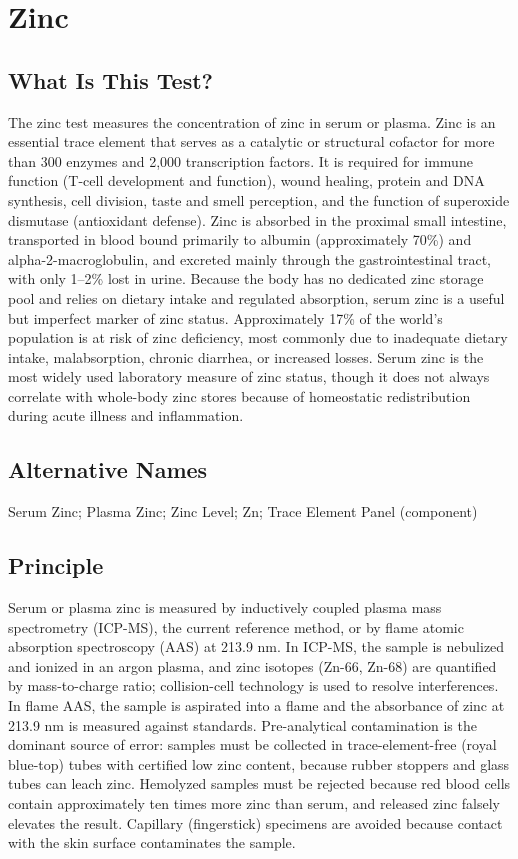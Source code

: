 \chapter{Zinc}

\section*{What Is This Test?}
The zinc test measures the concentration of zinc in serum or plasma. Zinc is an essential trace element that serves as a catalytic or structural cofactor for more than 300 enzymes and 2,000 transcription factors. It is required for immune function (T-cell development and function), wound healing, protein and DNA synthesis, cell division, taste and smell perception, and the function of superoxide dismutase (antioxidant defense). Zinc is absorbed in the proximal small intestine, transported in blood bound primarily to albumin (approximately 70\%) and alpha-2-macroglobulin, and excreted mainly through the gastrointestinal tract, with only 1--2\% lost in urine. Because the body has no dedicated zinc storage pool and relies on dietary intake and regulated absorption, serum zinc is a useful but imperfect marker of zinc status. Approximately 17\% of the world's population is at risk of zinc deficiency, most commonly due to inadequate dietary intake, malabsorption, chronic diarrhea, or increased losses. Serum zinc is the most widely used laboratory measure of zinc status, though it does not always correlate with whole-body zinc stores because of homeostatic redistribution during acute illness and inflammation.

\section*{Alternative Names}
Serum Zinc; Plasma Zinc; Zinc Level; Zn; Trace Element Panel (component)

\section*{Principle}
Serum or plasma zinc is measured by inductively coupled plasma mass spectrometry (ICP-MS), the current reference method, or by flame atomic absorption spectroscopy (AAS) at 213.9 nm. In ICP-MS, the sample is nebulized and ionized in an argon plasma, and zinc isotopes (Zn-66, Zn-68) are quantified by mass-to-charge ratio; collision-cell technology is used to resolve interferences. In flame AAS, the sample is aspirated into a flame and the absorbance of zinc at 213.9 nm is measured against standards. Pre-analytical contamination is the dominant source of error: samples must be collected in trace-element-free (royal blue-top) tubes with certified low zinc content, because rubber stoppers and glass tubes can leach zinc. Hemolyzed samples must be rejected because red blood cells contain approximately ten times more zinc than serum, and released zinc falsely elevates the result. Capillary (fingerstick) specimens are avoided because contact with the skin surface contaminates the sample.

